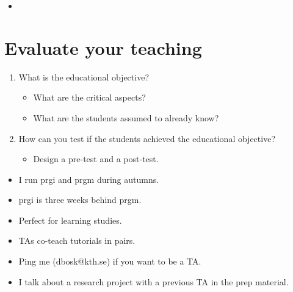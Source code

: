 \begin{frame}
  \begin{remark}
    \begin{itemize}
      \item {}
    \end{itemize}
  \end{remark}
\end{frame}

\section{Evaluate your teaching}

\begin{frame}
  \begin{exercise}
    \begin{enumerate}
      \item What is the educational objective?
        \begin{itemize}
          \item What are the critical aspects?
          \item What are the students assumed to already know?
        \end{itemize}
      \item How can you test if the students achieved the educational 
        objective?
        \begin{itemize}
          \item Design a pre-test and a post-test.
        \end{itemize}
    \end{enumerate}
  \end{exercise}
\end{frame}

\begin{frame}
  \begin{remark}
    \begin{itemize}
      \item I run prgi and prgm during autumns.
      \item prgi is three weeks behind prgm.
      \item Perfect for learning studies.
      \item TAs co-teach tutorials in pairs.
      \item Ping me (dbosk@kth.se) if you want to be a TA.
    \end{itemize}
  \end{remark}

  \begin{example}
    \begin{itemize}
      \item I talk about a research project with a previous TA in the prep 
        material.
    \end{itemize}
  \end{example}
\end{frame}

